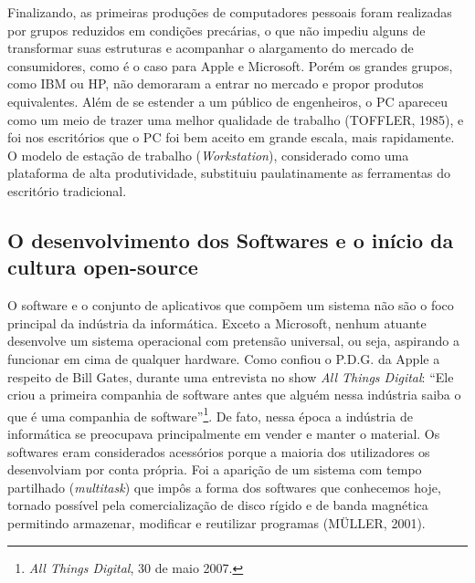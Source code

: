 Finalizando, as primeiras produções de computadores pessoais foram realizadas por grupos reduzidos em condições precárias, o que não impediu alguns de transformar suas estruturas e acompanhar o alargamento do mercado de consumidores, como é o caso para Apple e Microsoft. Porém os grandes grupos, como IBM ou HP, não demoraram a entrar no mercado e propor produtos equivalentes. Além de se estender a um público de engenheiros, o PC apareceu como um meio de trazer uma melhor qualidade de trabalho (TOFFLER, 1985), e foi nos escritórios que o PC foi bem aceito em grande escala, mais rapidamente. O modelo de estação de trabalho (\emph{Workstation}), considerado como uma plataforma de alta produtividade, substituiu paulatinamente as ferramentas do escritório tradicional.

\subsection{O desenvolvimento dos Softwares e o início da cultura open-source} \label{1.2.2}

O software e o conjunto de aplicativos que compõem um sistema não são o foco principal da indústria da informática. Exceto a Microsoft, nenhum atuante desenvolve um sistema operacional com pretensão universal, ou seja, aspirando a funcionar em cima de qualquer hardware. Como confiou o P.D.G. da Apple a respeito de Bill Gates, durante uma entrevista no show \emph{All Things Digital}: “Ele criou a primeira companhia de software antes que alguém nessa indústria saiba o que é uma companhia de software”\footnote{\emph{All Things Digital}, 30 de maio 2007.}. De fato, nessa época a indústria de informática se preocupava principalmente em vender e manter o material. Os softwares eram considerados acessórios porque a maioria dos utilizadores os desenvolviam por conta própria. Foi a aparição de um sistema com tempo partilhado (\emph{multitask}) que impôs a forma dos softwares que conhecemos hoje, tornado possível pela comercialização de disco rígido e de banda magnética permitindo armazenar, modificar e reutilizar programas (MÜLLER, 2001).


